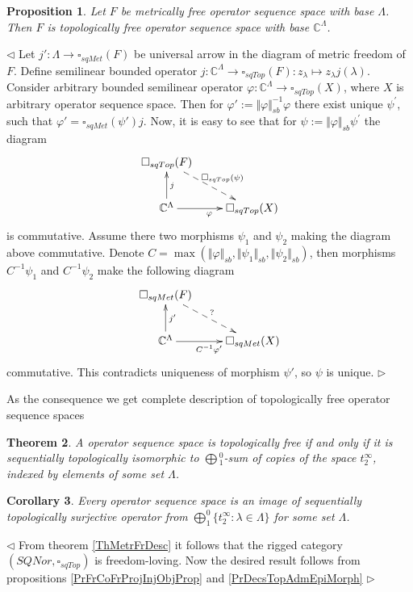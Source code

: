 \documentclass[12pt]{article}
\newtheorem{theorem}{Theorem}[subsection]
\newtheorem{proposition}[theorem]{Proposition}
\newtheorem{corollary}[theorem]{Corollary}
\newenvironment{proof}{\par $\triangleleft$}{$\triangleright$}
\begin{document}
\begin{proposition}\label{PrMetrFrIsTopFr} Let $F$ be metrically free operator sequence space with base $\Lambda$. Then $F$ is topologically free operator sequence space with base $\mathbb{C}^{\Lambda}$.
\end{proposition}
\begin{proof} Let $j':\Lambda\to \square_{sqMet}(F)$ be universal arrow in the diagram of metric freedom of $F$. Define semilinear bounded operator $j: \mathbb{C}^{\Lambda} \to \square_{sqTop}(F): z_\lambda\mapsto z_\lambda j(\lambda)$. Consider arbitrary bounded semilinear operator $\varphi : \mathbb{C}^{\Lambda} \to \square_{sqTop}(X)$, where $X$ is arbitrary operator sequence space. Then for $\varphi':=\Vert \varphi \Vert_{sb}^{-1}\varphi $ there exist unique $\psi^{'}$, such that $\varphi'=\square_{sqMet}(\psi')j$. Now, it is easy to see that for $\psi:=\Vert \varphi \Vert_{sb} \psi^{'}$ the diagram
$$
\xymatrix{
{\square_{sqTop}(F)}\ar@{-->}[dr]^{\square_{sqTop}(\psi)} & \\
{\mathbb{C}^{\Lambda}}\ar[u]_{j}\ar[r]_{\varphi}  &{\square_{sqTop}(X)} }
$$
is commutative. Assume there two morphisms $\psi_1$ and $\psi_2$ making the diagram above commutative. Denote $C=\max( \Vert \varphi\Vert_{sb}, \Vert \psi_1 \Vert_{sb}, \Vert \psi_2\Vert_{sb})$, then morphisms $C^{-1}\psi_1$ and $C^{-1}\psi_2$ make the following diagram
$$
\xymatrix{
{\square_{sqMet}(F)}\ar@{-->}[dr]^{?} & \\
{\mathbb{C}^\Lambda}\ar[u]_{j'}\ar[r]_{ C^{-1}\varphi'}  &{\square_{sqMet}(X)} }
$$
commutative. This contradicts uniqueness of morphism $\psi'$, so $\psi$ is unique.
\end{proof}

As the consequence we get complete description of topologically free operator sequence spaces

\begin{theorem}\label{ThTopFrDesc} 
A operator sequence space is topologically free if and only if it is sequentially topologically isomorphic to $\bigoplus{}_1^0$-sum of copies of the space $t_2^\infty$, indexed by elements of some set $\Lambda$.
\end{theorem}

\begin{corollary}\label{CorSQSpaceIsImgTopAdmEpiMorph}
Every operator sequence space is an image of sequentially topologically surjective operator from $\bigoplus_1^0\{t_2^\infty:\lambda\in\Lambda\}$  for some set $\Lambda$.
\end{corollary}
\begin{proof}
From theorem \ref{ThMetrFrDesc} it follows that the rigged category $(SQNor,\square_{sqTop})$ is freedom-loving. Now the desired result follows  from propositions \ref{PrFrCoFrProjInjObjProp} and \ref{PrDecsTopAdmEpiMorph}
\end{proof}
\end{document}
